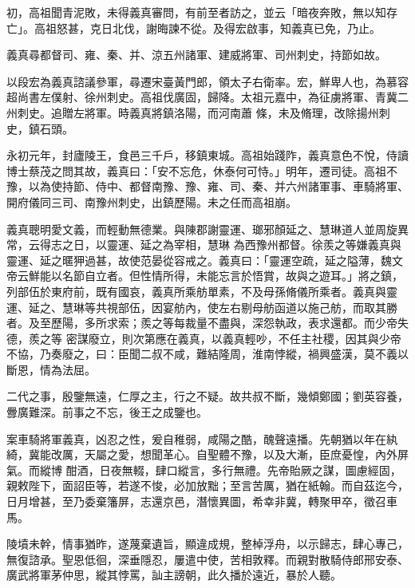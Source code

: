 \begin{pinyinscope}
 初，高祖聞青泥敗，未得義真審問，有前至者訪之，並云「暗夜奔敗，無以知存亡」。高祖怒甚，克日北伐，謝晦諫不從。及得宏啟事，知義真已免，乃止。



 義真尋都督司、雍、秦、并、涼五州諸軍、建威將軍、司州刺史，持節如故。



 以段宏為義真諮議參軍，尋遷宋臺黃門郎，領太子右衛率。宏，鮮卑人也，為慕容超尚書左僕射、徐州刺史。高祖伐廣固，歸降。太祖元嘉中，為征虜將軍、青冀二州刺史。追贈左將軍。時義真將鎮洛陽，而河南蕭
 條，未及脩理，改除揚州刺史，鎮石頭。



 永初元年，封廬陵王，食邑三千戶，移鎮東城。高祖始踐阼，義真意色不悅，侍讀博士蔡茂之問其故，義真曰：「安不忘危，休泰何可恃。」明年，遷司徒。高祖不豫，以為使持節、侍中、都督南豫、豫、雍、司、秦、并六州諸軍事、車騎將軍、開府儀同三司、南豫州刺史，出鎮歷陽。未之任而高祖崩。



 義真聰明愛文義，而輕動無德業。與陳郡謝靈運、瑯邪顏延之、慧琳道人並周旋異常，云得志之日，以靈運、延之為宰相，慧琳
 為西豫州都督。徐羨之等嫌義真與靈運、延之暱狎過甚，故使范晏從容戒之。義真曰：「靈運空疏，延之隘薄，魏文帝云鮮能以名節自立者。但性情所得，未能忘言於悟賞，故與之遊耳。」將之鎮，列部伍於東府前，既有國哀，義真所乘舫單素，不及母孫脩儀所乘者。義真與靈運、延之、慧琳等共視部伍，因宴舫內，使左右剔母舫函道以施己舫，而取其勝者。及至歷陽，多所求索；羨之等每裁量不盡與，深怨執政，表求還都。而少帝失德，羨之等
 密謀廢立，則次第應在義真，以義真輕吵，不任主社稷，因其與少帝不協，乃奏廢之，曰：臣聞二叔不咸，難結隆周，淮南悖縱，禍興盛漢，莫不義以斷恩，情為法屈。



 二代之事，殷鑒無遠，仁厚之主，行之不疑。故共叔不斷，幾傾鄭國；劉英容養，釁廣難深。前事之不忘，後王之成鑒也。



 案車騎將軍義真，凶忍之性，爰自稚弱，咸陽之酷，醜聲遠播。先朝猶以年在紈綺，冀能改厲，天屬之愛，想聞革心。自聖體不豫，以及大漸，臣庶憂惶，內外屏氣。而縱博
 酣酒，日夜無輟，肆口縱言，多行無禮。先帝貽厥之謀，圖慮經固，親敕陛下，面詔臣等，若遂不悛，必加放黜；至言苦厲，猶在紙翰。而自茲迄今，日月增甚，至乃委棄籓屏，志還京邑，潛懷異圖，希幸非冀，轉聚甲卒，徵召車馬。



 陵墳未幹，情事猶昨，遂蔑棄遺旨，顯違成規，整棹浮舟，以示歸志，肆心專己，無復諮承。聖恩低徊，深垂隱忍，屢遣中使，苦相敦釋。而親對散騎侍郎邢安泰、廣武將軍茅仲思，縱其悖罵，訕主謗朝，此久播於遠近，暴於人聽。




\end{pinyinscope}
